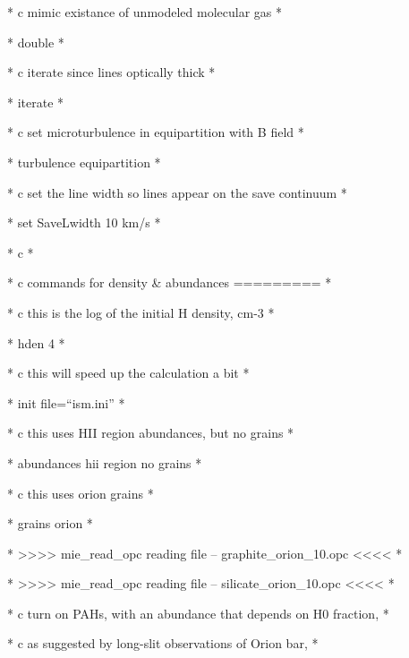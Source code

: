 {                       * c mimic existance of unmodeled molecular gas  
*

                       * double                                        
*

                       * c iterate since lines optically thick         
*

                       * iterate                                       
*

                       * c set microturbulence in equipartition with B field
*

                       * turbulence equipartition                      
*

                       * c set the line width so lines appear on the save
continuum                     *

                       * set SaveLwidth 10 km/s                       
*

                       * c                                             
*

                       * c commands for density \& abundances =========
*

                       * c this is the log of the initial H density, cm-3
*

                       * hden 4                                        
*

                       * c this will speed up the calculation a bit    
*

                       * init file=``ism.ini''                         
*

                       * c this uses HII region abundances, but no grains
*

                       * abundances hii region no grains               
*

                       * c this uses orion grains                      
*

                       * grains orion                                  
*

                       * >>>> mie_read_opc reading file --
graphite_orion_10.opc                    <<<< *

                       * >>>> mie_read_opc reading file --
silicate_orion_10.opc                    <<<< *

                       * c turn on PAHs, with an abundance that depends
on H0 fraction,                  *

                       * c as suggested by long-slit observations of Orion
bar,                          *

}
